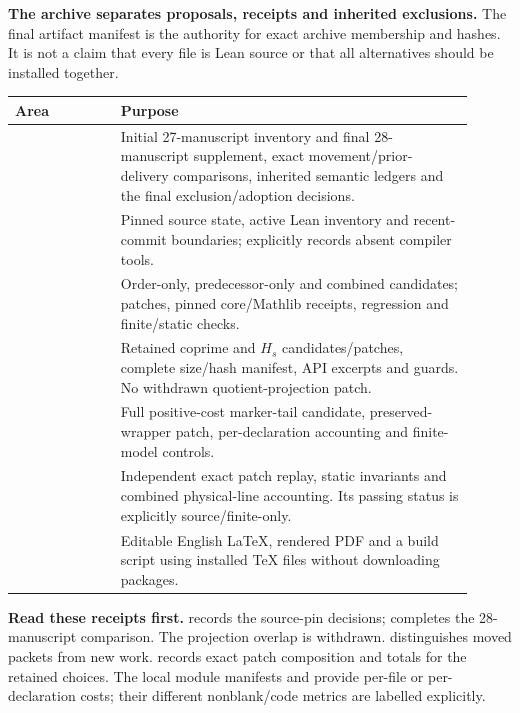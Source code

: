 \textbf{The archive separates proposals, receipts and inherited exclusions.} The final artifact manifest is the authority for exact archive membership and hashes. It is not a claim that every file is Lean source or that all alternatives should be installed together.

\begin{tabular}{@{}L{0.21\linewidth}L{0.70\linewidth}@{}}\toprule
Area & Purpose\\\midrule
{} & Initial 27-manuscript inventory and final 28-manuscript supplement, exact movement/prior-delivery comparisons, inherited semantic ledgers and the final exclusion/adoption decisions.\\[5pt]
 & Pinned source state, active Lean inventory and recent-commit boundaries; explicitly records absent compiler tools.\\[5pt]
 & Order-only, predecessor-only and combined candidates; patches, pinned core/Mathlib receipts, regression and finite/static checks.\\[5pt]
 & Retained coprime and $H_s$ candidates/patches, complete size/hash manifest, API excerpts and guards. No withdrawn quotient-projection patch.\\[5pt]
 & Full positive-cost marker-tail candidate, preserved-wrapper patch, per-declaration accounting and finite-model controls.\\[5pt]
 & Independent exact patch replay, static invariants and combined physical-line accounting. Its passing status is explicitly source/finite-only.\\[5pt]
 & Editable English LaTeX, rendered PDF and a build script using installed TeX files without downloading packages.\\\bottomrule
\end{tabular}

\textbf{Read these receipts first.}  records the source-pin decisions;  completes the 28-manuscript comparison. The projection overlap is withdrawn.  distinguishes moved packets from new work.  records exact patch composition and totals for the retained choices. The local module manifests and  provide per-file or per-declaration costs; their different nonblank/code metrics are labelled explicitly.

